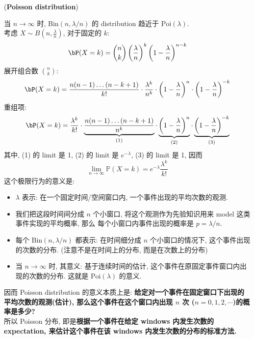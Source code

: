 \begin{example}{(\textbf{Poisson distribution})}
\begin{center}
\end{center}
\begin{remark}
当 \(n\to\infty\) 时, 
\(\text{Bin}(n, \lambda/n)\) 的 distribution 
趋近于 \(\text{Poi}(\lambda)\).\\
考虑 $X \sim B\left(n, \frac{\lambda}{n}\right)$, 对于固定的 $k$:
$$
\bP(X=k)=\binom{n}{k}\left(\frac{\lambda}{n}\right)^k\left(1-\frac{\lambda}{n}\right)^{n-k}
$$
展开组合数 $\binom{n}{k}$:
$$
\bP(X=k)=\frac{n(n-1) \ldots(n-k+1)}{k!} \cdot \frac{\lambda^k}{n^k} \cdot\left(1-\frac{\lambda}{n}\right)^n \cdot\left(1-\frac{\lambda}{n}\right)^{-k}
$$
重组项:
$$
\bP(X=k)=\frac{\lambda^k}{k!} \cdot \underbrace{\frac{n(n-1) \ldots(n-k+1)}{n^k}}_{(1)} \cdot \underbrace{\left(1-\frac{\lambda}{n}\right)^n}_{(2)} \cdot \underbrace{\left(1-\frac{\lambda}{n}\right)^{-k}}_{(3)}
$$
其中, (1) 的 limit 是 1, 
(2) 的 limit 是 $e^{-\lambda}$, (3) 的 limit 是 1, 因而 
\[
\lim_{n\to\infty} \mathbb{P}(X=k)= e^{-\lambda} \frac{\lambda^k}{k!}
\]
这个极限行为的意义是:
\begin{itemize}
    \item \(\lambda \) 表示: 在一个固定时间/空间窗口内, 一个事件出现的平均次数的观测.
    \item 我们把这段时间间分成 \(n\) 个小窗口, 将这个观测作为先验知识用来 model 这类事件实现的平均概率, 那么
     每个小窗口内事件出现的概率是 \(p = \lambda/n\).  
    \item 每个 \(\text{Bin}(n,\lambda / n)\) 都表示: 在时间细分成
     \(n\) 个小窗口的情况下, 这个事件出现的次数的分布. (注意不是在时间上的分布, 而是在次数上的分布)
    \item 当 \(n\to\infty\) 时, 其意义: 基于连续时间的估计, 
    这个事件在原固定事件窗口内出现的次数的分布. 这就是 
    \(\text{Poi}(\lambda)\) 的意义.
\end{itemize}
因而 Poisson distribution 的意义本质上是: 
\textbf{
给定对一个事件在固定窗口下出现的平均次数的观测(估计), 
那么这个事件在这个窗口内出现 \(n\) 次 
(\(n = 0,1,2,\cdots  \))的概率是多少?}\\
所以 Poisson 分布, 即是\textbf{根据一个事件在给定 windows 内发生次数的 expectation, 来估计这个事件在该 windows 内发生次数的分布的标准方法.}  \\
\end{remark}


\end{example}
